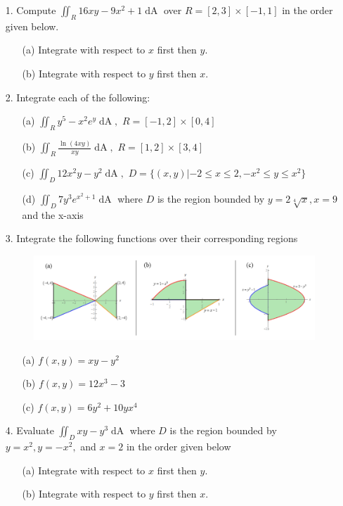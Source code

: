 \documentclass[12pt, amssymb, one column]{article}
\begin{document}
\begin{itemize}
	\item[1.] Compute $\iint_R 16xy-9x^2+1 \mathop{dA} $ over $R=[2,3] \times [-1,1]$ in the order given below.
	\begin{itemize}
		\item[(a)] Integrate with respect to $x$ first then $y$.
		\item[(b)] Integrate with respect to $y$ first then $x$.
	\end{itemize}
	
	\item[2.] Integrate each of the following:
		\begin{itemize}
			\item[(a)] $\iint_R y^5-x^2e^y \mathop{dA}, \,\, R=[-1,2] \times [0,4]$
			\item[(b)] $\iint_R \frac{\ln(4xy)}{xy} \mathop{dA}, \,\, R=[1,2]\times[3,4]$
			\item[(c)] $\iint_D 12x^2y-y^2 \mathop{dA}, \,\, D=\{(x,y)|-2\leq x \leq 2, -x^2 \leq y \leq x^2\}$
			\item[(d)] $\iint_D 7y^3e^{x^2+1} \mathop{dA}$ where $D$ is the region bounded by $y=2\sqrt[4]{x},x=9$ and the x-axis
		\end{itemize}
	
	\item[3.] Integrate the following functions over their corresponding regions
	\begin{figure}[h]
		\centering
		\includegraphics[width=.8\textwidth]{regions.png}\\
	\end{figure}
		\begin{itemize}
			\item[(a)] $f(x,y) = xy-y^2$
			\item[(b)] $f(x,y) = 12x^3-3$
			\item[(c)] $f(x,y) = 6y^2 + 10yx^4$
		\end{itemize}
	
	\item[4.] Evaluate $\iint_D xy-y^3 \mathop{dA}$ where $D$ is the region bounded by $y=x^2, y=-x^2,$ and $x=2$ in the order given below
		\begin{itemize}
			\item[(a)] Integrate with respect to $x$ first then $y$.
			\item[(b)] Integrate with respect to $y$ first then $x$.
		\end{itemize}
	

\end{itemize}
\end{document}
